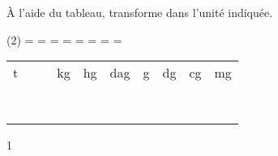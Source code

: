 \documentclass[a4paper,11pt]{report}
\begin{document}
\begin{exop}
{À l'aide du tableau, transforme dans l'unité indiquée.
\begin{tasks}(2)
    \task {}= \dotfill \hspace{0.3cm}
     \hspace{0.3cm}
    \task {} = \dotfill \hspace{0.3cm}
     \hspace{0.3cm}
  \task {}= \dotfill \hspace{0.3cm}
    \tunit{}{\tonne} \hspace{0.3cm}
    \task {}= \dotfill \hspace{0.3cm}
     \hspace{0.3cm}
     \task {}= \dotfill \hspace{0.3cm}
     \hspace{0.3cm}
     \task {}= \dotfill \hspace{0.3cm}
     \hspace{0.3cm}
     \task {}= \dotfill \hspace{0.3cm}
     \hspace{0.3cm}
     \task {}= \dotfill \hspace{0.3cm}
    \tunit{}{\tonne} \hspace{0.3cm}
\end{tasks}
\begin{center}


\begin{tabular}{*{10}{|x{0.9cm}}|}
 \hline
  t & & & kg & hg & dag &g &dg &cg&mg\\   
 & & & & & & & & & \\ 
 \hline

 &   & & & & & & & & \\ 
\hline
 & & & & & & & & & \\ 
 \hline

 &   & & & & & & & & \\ 
\hline
 & & & & & & & & & \\ 
 \hline

 &   & & & & & & & & \\ 
\hline
 & & & & & & & & & \\ 
 \hline

 &   & & & & & & & & \\ 
\hline

\end{tabular}
\end{center}
}
{1}
\end{exop}
\end{document}
